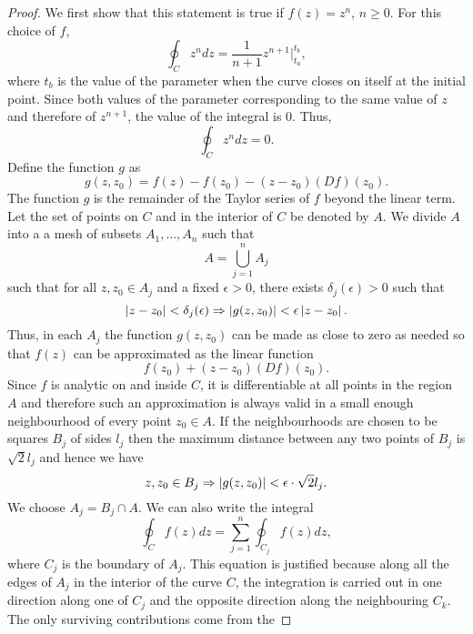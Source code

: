 \begin{proof}
We first show that this statement is true if $f(z) = z^n$, $n \ge 0$. For this
choice of $f$,
\[
\oint_C z^n dz = \frac{1}{n+1} z^{n+1}\big|_{t_a}^{t_b},
\]
where $t_b$ is the value of the parameter when the curve closes on itself at
the initial point. Since both values of the parameter corresponding to the
same value of $z$ and therefore of $z^{n+1}$, the value of the integral is $0$.
Thus,
\begin{equation}\label{c4s1e10}
\oint_C z^n dz = 0.
\end{equation}
Define the function $g$ as
\begin{equation}\label{c4s1e11}
g(z, z_0) = f(z) - f(z_0) - (z - z_0)(Df)(z_0).
\end{equation}
The function $g$ is the remainder of the Taylor series of $f$ beyond the
linear term. Let the set of points on $C$ and in the interior of $C$ be denoted
by $A$. We divide $A$ into a a mesh of subsets $A_1, \ldots, A_n$ such that
\begin{equation}\label{c4s1e12}
A = \bigcup_{j=1}^n A_j
\end{equation}
such that for all $z, z_0 \in A_j$ and a fixed $\epsilon > 0$, there exists
$\delta_j(\epsilon) > 0$ such that
\begin{equation}\label{c4s1e13}
\left\vert{z - z_0}\right\vert < \delta_j(\epsilon) \Rightarrow \left\vert{g(z, z_0)}\right\vert < \epsilon
\left\vert{z - z_0}\right\vert.
\end{equation}
Thus, in each $A_j$ the function $g(z, z_0)$ can be made as close to zero as
needed so that $f(z)$ can be approximated as the linear function
\[
f(z_0) + (z - z_0)(Df)(z_0).
\]
Since $f$ is analytic on and inside $C$, it is differentiable at all points
in the region $A$ and therefore such an approximation is always valid in a
small enough neighbourhood of every point $z_0 \in A$. If the neighbourhoods
are chosen to be squares $B_j$ of sides $l_j$ then the maximum distance
between any two points of $B_j$ is $\sqrt{2}l_j$ and hence we have
\begin{equation}\label{c4s1e14}
z, z_0 \in B_j \Rightarrow \left\vert{g(z,z_0)}\right\vert < \epsilon \cdot \sqrt{2}l_j.
\end{equation}
We choose $A_j = B_j \cap A$. We can also write the integral
\[
\oint_C f(z)dz = \sum_{j=1}^n \oint_{C_j}f(z)dz,
\]
where $C_j$ is the boundary of $A_j$. This equation is justified because along
all the edges of $A_j$ in the interior of the curve $C$, the integration is
carried out in one direction along one of $C_j$ and the opposite direction
along the neighbouring $C_k$. The only surviving contributions come from the

\end{proof}
